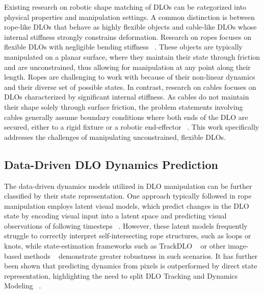 \documentclass[letterpaper, 10 pt, conference]{ieeeconf}  %
\begin{document}
Existing research on robotic shape matching of DLOs can be categorized into physical properties and manipulation settings. A common distinction is between rope-like DLOs that behave as highly flexible objects and cable-like DLOs whose internal stiffness strongly constrains deformation. Research on ropes focuses on flexible DLOs with negligible bending stiffness ~\cite{yan_learning_2020, zhang_deformable_2021, lee_sample-efficient_2022, yan_self-supervised_2020}. These objects are typically manipulated on a planar surface, where they maintain their state through friction and are unconstrained, thus allowing for manipulation at any point along their length. Ropes are challenging to work with because of their non-linear dynamics and their diverse set of possible states. In contrast, research on cables focuses on DLOs characterized by significant internal stiffness. As cables do not maintain their shape solely through surface friction, the problem statements involving cables generally assume boundary conditions where both ends of the DLO are secured, either to a rigid fixture or a robotic end-effector ~\cite{gu_learning_2025, yue_lstm-gcn_2025, yu_hybrid_2025, yu_shape_2022, yang_learning_2021}. This work specifically addresses the challenges of manipulating unconstrained, flexible DLOs. 


\subsection{Data-Driven DLO Dynamics Prediction}

The data-driven dynamics models utilized in DLO mani\-pulation can be further classified by their state representation. One approach typically followed in rope manipulation employs latent visual models, which predict changes in the DLO state by encoding visual input into a latent space and predicting visual observations of following timesteps ~\cite{yan_learning_2020, zhang_deformable_2021, lee_sample-efficient_2022, li_deformnet_2024}. However, these latent models frequently struggle to correctly interpret self-intersecting rope structures, such as loops or knots, while state-estimation frameworks such as TrackDLO ~\cite{xiang_trackdlo_2023} or other image-based methods ~\cite{choi_mbest_2023, caporali_rt-dlo_2023} demonstrate greater robustness in such scenarios. It has further been shown that predicting dynamics from pixels is outperformed by direct state representation, highlighting the need to split DLO Tracking and Dynamics Modeling ~\cite{yan_self-supervised_2020}. 
\end{document}
